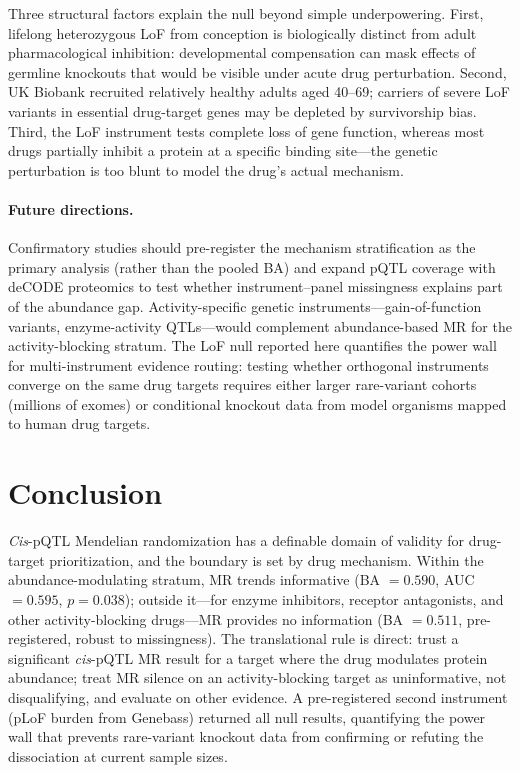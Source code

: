 \documentclass[11pt]{article}
\begin{document}
Three structural factors explain the null beyond simple underpowering. First, lifelong heterozygous LoF from conception is biologically distinct from adult pharmacological inhibition: developmental compensation can mask effects of germline knockouts that would be visible under acute drug perturbation. Second, UK Biobank recruited relatively healthy adults aged 40--69; carriers of severe LoF variants in essential drug-target genes may be depleted by survivorship bias. Third, the LoF instrument tests complete loss of gene function, whereas most drugs partially inhibit a protein at a specific binding site---the genetic perturbation is too blunt to model the drug's actual mechanism.

\paragraph{Future directions.}
Confirmatory studies should pre-register the mechanism stratification as the primary analysis (rather than the pooled BA) and expand pQTL coverage with deCODE proteomics to test whether instrument--panel missingness explains part of the abundance gap. Activity-specific genetic instruments---gain-of-function variants, enzyme-activity QTLs---would complement abundance-based MR for the activity-blocking stratum. The LoF null reported here quantifies the power wall for multi-instrument evidence routing: testing whether orthogonal instruments converge on the same drug targets requires either larger rare-variant cohorts (millions of exomes) or conditional knockout data from model organisms mapped to human drug targets.

\section{Conclusion}

\emph{Cis}-pQTL Mendelian randomization has a definable domain of validity for drug-target prioritization, and the boundary is set by drug mechanism. Within the abundance-modulating stratum, MR trends informative (BA $= 0.590$, AUC $= 0.595$, $p = 0.038$); outside it---for enzyme inhibitors, receptor antagonists, and other activity-blocking drugs---MR provides no information (BA $= 0.511$, pre-registered, robust to missingness). The translational rule is direct: trust a significant \emph{cis}-pQTL MR result for a target where the drug modulates protein abundance; treat MR silence on an activity-blocking target as uninformative, not disqualifying, and evaluate on other evidence. A pre-registered second instrument (pLoF burden from Genebass) returned all null results, quantifying the power wall that prevents rare-variant knockout data from confirming or refuting the dissociation at current sample sizes.
\end{document}
